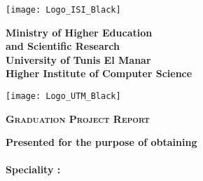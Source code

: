 


\thispagestyle{cover}%
\hspace{-47pt}
\begin{minipage}[l]{0.2\columnwidth}
\vspace{6mm}
\texttt{[image: Logo\_ISI\_Black]}\\
\end{minipage}
\hfill
\begin{minipage}[l]{0.6\columnwidth}
\centering
\footnotesize
\textbf{{Ministry of Higher Education \\ and Scientific Research}}\\
\vspace{1.5mm}
\textbf{{University of Tunis El Manar}}\\
\vspace{1.5mm}
\textbf{{Higher Institute of Computer Science}}\\
\end{minipage}
\hfill
\begin{minipage}[l]{0.02\columnwidth}
\end{minipage}
\hfill
\begin{minipage}[l]{0.18\columnwidth}
\vspace{6mm}
\texttt{[image: Logo\_UTM\_Black]}\\
\end{minipage}
\vskip1.5cm

\begin{center}
{\LARGE{\textbf{\textsc{Graduation Project Report}}}}\\
\vskip0.5cm
\large

{\textbf{Presented for the purpose of obtaining}}\\
\vskip2mm
{\textbf{\@diplomaName}}\\
{\textbf{Speciality : \@speciality}}\\
{}
\end{center}

